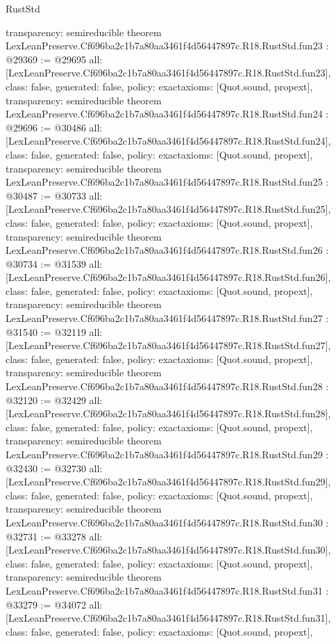 \begin{lexlean}{RustStd}
\begin{coremodule}
{  transparency: semireducible
}
theorem LexLeanPreserve.Cf696ba2c1b7a80aa3461f4d56447897c.R18.RustStd.fun23 : @29369 := @29695 {
  all: [LexLeanPreserve.Cf696ba2c1b7a80aa3461f4d56447897c.R18.RustStd.fun23],
  class: false,
  generated: false,
  policy: exact{axioms: [Quot.sound, propext]},
  transparency: semireducible
}
theorem LexLeanPreserve.Cf696ba2c1b7a80aa3461f4d56447897c.R18.RustStd.fun24 : @29696 := @30486 {
  all: [LexLeanPreserve.Cf696ba2c1b7a80aa3461f4d56447897c.R18.RustStd.fun24],
  class: false,
  generated: false,
  policy: exact{axioms: [Quot.sound, propext]},
  transparency: semireducible
}
theorem LexLeanPreserve.Cf696ba2c1b7a80aa3461f4d56447897c.R18.RustStd.fun25 : @30487 := @30733 {
  all: [LexLeanPreserve.Cf696ba2c1b7a80aa3461f4d56447897c.R18.RustStd.fun25],
  class: false,
  generated: false,
  policy: exact{axioms: [Quot.sound, propext]},
  transparency: semireducible
}
theorem LexLeanPreserve.Cf696ba2c1b7a80aa3461f4d56447897c.R18.RustStd.fun26 : @30734 := @31539 {
  all: [LexLeanPreserve.Cf696ba2c1b7a80aa3461f4d56447897c.R18.RustStd.fun26],
  class: false,
  generated: false,
  policy: exact{axioms: [Quot.sound, propext]},
  transparency: semireducible
}
theorem LexLeanPreserve.Cf696ba2c1b7a80aa3461f4d56447897c.R18.RustStd.fun27 : @31540 := @32119 {
  all: [LexLeanPreserve.Cf696ba2c1b7a80aa3461f4d56447897c.R18.RustStd.fun27],
  class: false,
  generated: false,
  policy: exact{axioms: [Quot.sound, propext]},
  transparency: semireducible
}
theorem LexLeanPreserve.Cf696ba2c1b7a80aa3461f4d56447897c.R18.RustStd.fun28 : @32120 := @32429 {
  all: [LexLeanPreserve.Cf696ba2c1b7a80aa3461f4d56447897c.R18.RustStd.fun28],
  class: false,
  generated: false,
  policy: exact{axioms: [Quot.sound, propext]},
  transparency: semireducible
}
theorem LexLeanPreserve.Cf696ba2c1b7a80aa3461f4d56447897c.R18.RustStd.fun29 : @32430 := @32730 {
  all: [LexLeanPreserve.Cf696ba2c1b7a80aa3461f4d56447897c.R18.RustStd.fun29],
  class: false,
  generated: false,
  policy: exact{axioms: [Quot.sound, propext]},
  transparency: semireducible
}
theorem LexLeanPreserve.Cf696ba2c1b7a80aa3461f4d56447897c.R18.RustStd.fun30 : @32731 := @33278 {
  all: [LexLeanPreserve.Cf696ba2c1b7a80aa3461f4d56447897c.R18.RustStd.fun30],
  class: false,
  generated: false,
  policy: exact{axioms: [Quot.sound, propext]},
  transparency: semireducible
}
theorem LexLeanPreserve.Cf696ba2c1b7a80aa3461f4d56447897c.R18.RustStd.fun31 : @33279 := @34072 {
  all: [LexLeanPreserve.Cf696ba2c1b7a80aa3461f4d56447897c.R18.RustStd.fun31],
  class: false,
  generated: false,
  policy: exact{axioms: [Quot.sound, propext]},
}
\end{coremodule}
\end{lexlean}
